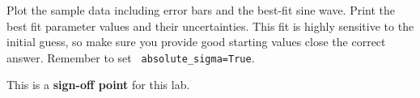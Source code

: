 \begin{plot}
Plot the sample data including error bars and the best-fit sine wave.  Print
the best fit parameter values and their uncertainties.  This fit is
highly sensitive to the initial guess, so make sure you provide good
starting values close the correct answer.  Remember to set {\tt
  absolute{\_}sigma=True}.
\end{plot}

This is a \textbf{sign-off point} for this lab. 
